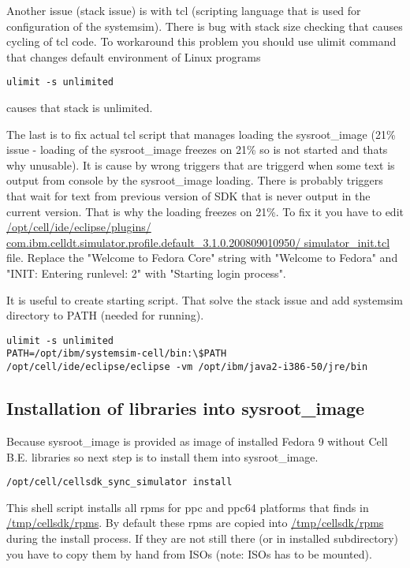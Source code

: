 \par
Another issue (stack issue) is with tcl (scripting language that is used for configuration of the systemsim).
There is bug with stack size checking that causes cycling of tcl code.
To workaround this problem you should use ulimit command that changes default environment of Linux programs

\begin{verbatim}
ulimit -s unlimited
\end{verbatim}

causes that stack is unlimited.

\par
The last is to fix actual tcl script that manages loading the sysroot\_image (21\% issue - loading of the sysroot\_image freezes on 21\% so is not started and thats why unusable).
It is cause by wrong triggers that are triggerd when some text is output from console by the sysroot\_image loading.
There is probably triggers that wait for text from previous version of SDK that is never output in the current version.
That is why the loading freezes on 21\%.
To fix it you have to edit \url{/opt/cell/ide/eclipse/plugins/ com.ibm.celldt.simulator.profile.default_3.1.0.200809010950/ simulator_init.tcl} file.
Replace the "Welcome to Fedora Core" string with "Welcome to Fedora" and "INIT: Entering runlevel: 2" with "Starting login process".

It is useful to create starting script. That solve the stack issue and add systemsim directory to PATH (needed for running).

\begin{verbatim}
ulimit -s unlimited
PATH=/opt/ibm/systemsim-cell/bin:\$PATH
/opt/cell/ide/eclipse/eclipse -vm /opt/ibm/java2-i386-50/jre/bin
\end{verbatim}

\subsection{Installation of libraries into sysroot\_image}

Because sysroot\_image is provided as image of installed Fedora 9 without Cell B.E. libraries so next step is to install them into sysroot\_image.

\begin{verbatim}
/opt/cell/cellsdk_sync_simulator install
\end{verbatim}

This shell script installs all rpms for ppc and ppc64 platforms that finds in \url{/tmp/cellsdk/rpms}.
By default these rpms are copied into \url{/tmp/cellsdk/rpms} during the install process.
If they are not still there (or in installed subdirectory) you have to copy them by hand from ISOs (note: ISOs has to be mounted).

